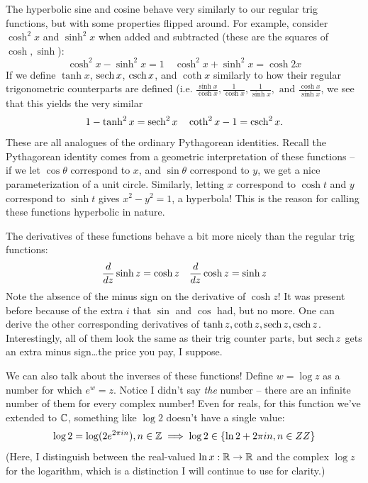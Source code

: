 \documentclass[12pt]{scrartcl}
\begin{document}
The hyperbolic sine and cosine behave very similarly to our regular trig functions, but with some properties flipped around. For example, consider $\cosh^2 x$ and $\sinh^2 x$ when added and subtracted (these are the squares of $\cosh, \sinh$):
\[
	\cosh^2 x - \sinh^2 x = 1 \quad \cosh^2 x + \sinh^2 x = \cosh 2x
\]
If we define $\tanh x$, $\operatorname{\mathrm{sech}} x$, $\operatorname{\mathrm{csch}} x$, and $\coth x$ similarly to how their regular trigonometric counterparts are defined (i.e. $\frac{\sinh x}{\cosh x}, \frac{1}{\cosh x}, \frac{1}{\sinh x}, \text{ and } \frac{\cosh x}{\sinh x}$, we see that this yields the very similar
\[
	1 - \tanh^2 x = \operatorname{\mathrm{sech}}^2 x \quad \coth^2 x - 1 = \operatorname{\mathrm{csch}}^2 x.
\]
These are all analogues of the ordinary Pythagorean identities.  Recall the Pythagorean identity comes from a geometric interpretation of these functions -- if we let $\cos \theta$ correspond to $x$, and $\sin \theta$ correspond to $y$, we get a nice parameterization of a unit circle. Similarly, letting $x$ correspond to $\cosh t$ and $y$ correspond to $\sinh t$ gives $x^2 - y^2 = 1$, a hyperbola! This is the reason for calling these functions hyperbolic in nature.

The derivatives of these functions behave a bit more nicely than the regular trig functions:
\[
	\frac{d }{d z} \sinh z = \cosh z \quad \frac{d }{d z} \cosh z = \sinh z
\]
Note the absence of the minus sign on the derivative of $\cosh z$! It was present before because of the extra $i$ that $\sin$ and $\cos$ had, but no more. One can derive the other corresponding derivatives of $\tanh z, \coth z, \operatorname{\mathrm{sech}} z, \operatorname{\mathrm{csch}} z$. Interestingly, all of them look the same as their trig counter parts, but $\operatorname{\mathrm{sech}} z$ gets an extra minus sign\ldots the price you pay, I suppose.

We can also talk about the inverses of these functions! Define $w = \log z$ as a number for which $e^w = z$. Notice I didn't say \textit{the} number -- there are an infinite number of them for every complex number! Even for reals, for this function we've extended to $\mathbb C$, something like $\log 2$ doesn't have a single value:
\[
	\log 2 = \log (2 e^{2\pi i n}), n\in \mathbb Z \implies \log 2 \in \{\ln 2 + 2\pi i n, n \in ZZ\}
\]
(Here, I distinguish between the real-valued $\ln x : \mathbb R \to \mathbb R$ and the complex $\log z$ for the logarithm, which is a distinction I will continue to use for clarity.)
\end{document}
